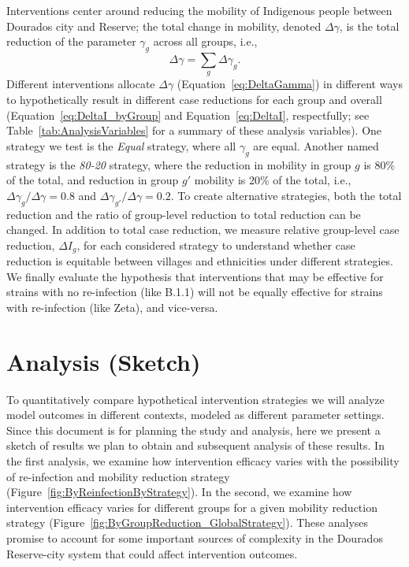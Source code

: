\documentclass[
  letterpaper,
  abstract]{scrartcl}
\begin{document}
Interventions center around reducing the mobility of Indigenous people between
Dourados city and Reserve; the total change in mobility, denoted $\Delta
\gamma$, is the total reduction of the parameter $\gamma_g$ across all 
groups, i.e., 
\begin{equation}
  \Delta \gamma = \sum_g \Delta \gamma_g.
  \label{eq:DeltaGamma}
\end{equation}
\noindent
Different interventions allocate $\Delta \gamma$ (Equation~\ref{eq:DeltaGamma})
in different ways to hypothetically result in different case reductions for each
group and overall (Equation~\ref{eq:DeltaI_byGroup} and Equation~\ref{eq:DeltaI},
respectfully; see Table~\ref{tab:AnalysisVariables} for a summary of these analysis
variables).
One strategy we test is the \emph{Equal} strategy, where all $\gamma_g$ are
equal. Another named strategy is the \emph{80-20} strategy, where the
reduction in mobility in group $g$ is 80\% of the total, and reduction in
group $g'$ mobility is 20\% of the total, i.e., $\Delta\gamma_g / \Delta\gamma =
0.8$ and $\Delta\gamma_{g'} / \Delta\gamma = 0.2$. To create alternative
strategies, both the total reduction and the ratio of group-level reduction to 
total reduction can be changed. In addition to total case reduction, we 
measure relative group-level case reduction, $\Delta I_g$, 
for each considered strategy to understand whether case reduction is equitable
between villages and ethnicities under different strategies. 
We finally evaluate the hypothesis that interventions that may be effective for
strains with no re-infection (like B.1.1) will not be equally effective for
strains with re-infection (like Zeta), and vice-versa. 


\section{Analysis (Sketch)}\label{analysis-sketch}

To quantitatively compare hypothetical intervention strategies we will analyze 
model outcomes in different contexts, modeled as different parameter settings.
Since this document is for planning the study and analysis, here we present a sketch
of results we plan to obtain and subsequent analysis of these results. In the first
analysis, we examine how intervention efficacy varies with the possibility of
re-infection and mobility reduction strategy
(Figure~\ref{fig:ByReinfectionByStrategy}). In the second, we examine how
intervention efficacy varies for different groups for a given mobility reduction
strategy (Figure~\ref{fig:ByGroupReduction_GlobalStrategy}). These analyses 
promise to account for some important sources of complexity in 
the Dourados Reserve-city system that could affect intervention outcomes.
\end{document}
